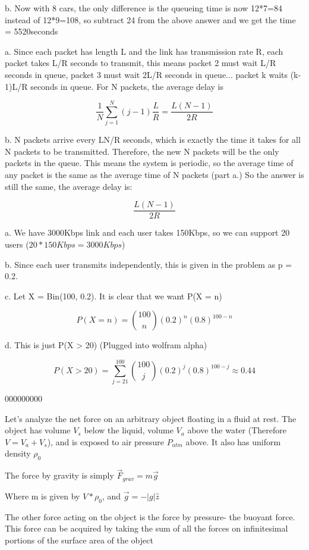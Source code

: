 \documentclass{article}
\begin{document}
b. Now with 8 cars, the only difference is the queueing time is now 12*7=84 instead of 12*9=108, so subtract 24 from the above answer and we get the time = 5520seconds


a. Since each packet has length L and the link has transmission rate R, each packet takes L/R seconds to transmit, this means packet 2 must wait L/R seconds in queue, packet 3 must wait 2L/R seconds in queue... packet k waits (k-1)L/R seconds in queue. For N packets, the average delay is

$$\frac{1}{N}\sum_{j=1}^{N} (j-1) \frac{L}{R} = \frac{L (N-1)}{2R}$$

b. N packets arrive every LN/R seconds, which is exactly the time it takes for all N packets to be transmitted. Therefore, the new N packets will be the only packets in the queue. This means the system is periodic, so the average time of any packet is the same as the average time of N packets (part a.) So the answer is still the same, the average delay is:

$$\frac{L (N-1)}{2R}$$


a. We have 3000Kbps link and each user takes 150Kbps, so we can support 20 users ($20*150Kbps = 3000Kbps$)

b. Since each user transmits independently, this is given in the problem as p = 0.2.

c. Let X = Bin(100,  0.2).  It is clear that we want P(X = n)

$$P(X = n) = {100 \choose n}(0.2)^n (0.8)^{100-n} $$

d. This is just P(X > 20) (Plugged into wolfram alpha)

$$ P(X > 20) = \sum_{j=21}^{100} {100 \choose j}(0.2)^j (0.8)^{100-j} \approx 0.44  $$ 

000000000

Let's analyze the net force on an arbitrary object floating in a fluid at rest. The object has volume $V_s$ below the liquid, volume $V_a$ above the water (Therefore $V = V_a + V_s$), and is exposed to air pressure $P_{atm}$ above. It also has uniform density $\rho_0$

The force by gravity is simply $\vec{F}_{grav} = m\vec{g}$

Where m is given by $V * \rho_0$, and $\vec{g} = -|g| \hat{z}$

The other force acting on the object is the force by pressure- the buoyant force. This force can be acquired by taking the sum of all the forces on infinitesimal portions of the surface area of the object
\end{document}
